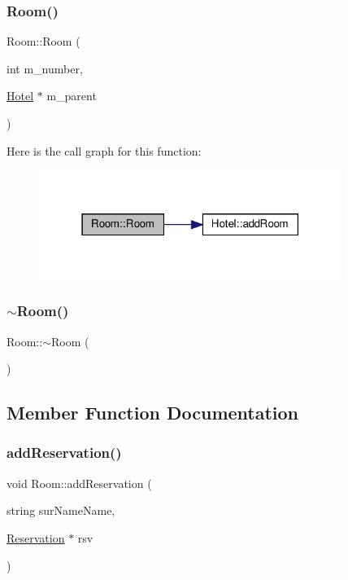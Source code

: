 \subsubsection{\texorpdfstring{Room()}{Room()}}
{\footnotesize\ttfamily Room\+::\+Room (\begin{DoxyParamCaption}\item[{int}]{m\+\_\+number,  }\item[{\hyperlink{class_hotel}{Hotel} $\ast$}]{m\+\_\+parent }\end{DoxyParamCaption})}

Here is the call graph for this function\+:\nopagebreak
\begin{figure}[H]
\begin{center}
\leavevmode
\includegraphics[width=279pt]{class_room_a588e59f9543f9e78cde2b4a812535719_cgraph}
\end{center}
\end{figure}
\mbox{\label{class_room_a67d5da09983cc53097807fd43ba5481a}} 
\subsubsection{\texorpdfstring{$\sim$\+Room()}{~Room()}}
{\footnotesize\ttfamily Room\+::$\sim$\+Room (\begin{DoxyParamCaption}{ }\end{DoxyParamCaption})\hspace{0.3cm}{\ttfamily [inline]}}



\subsection{Member Function Documentation}
\mbox{\label{class_room_aa606091a9d9aad6801675384c77d6634}} 
\subsubsection{\texorpdfstring{add\+Reservation()}{addReservation()}}
{\footnotesize\ttfamily void Room\+::add\+Reservation (\begin{DoxyParamCaption}\item[{string}]{sur\+Name\+Name,  }\item[{\hyperlink{class_reservation}{Reservation} $\ast$}]{rsv }\end{DoxyParamCaption})\hspace{0.3cm}{\ttfamily [inline]}}

